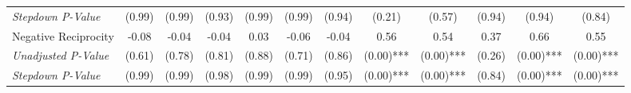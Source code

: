 \begin{tabular}{l c c c c c c c c c c c}
\quad \textit{Stepdown P-Value} & (0.99) & (0.99) & (0.93) & (0.99) & (0.99) & (0.94) & (0.21) & (0.57) & (0.94) & (0.94) & (0.84) \\
Negative Reciprocity & -0.08 & -0.04 & -0.04 & 0.03 & -0.06 & -0.04 & 0.56 & 0.54 & 0.37 & 0.66 & 0.55 \\
\quad \textit{Unadjusted P-Value} & (0.61) & (0.78) & (0.81) & (0.88) & (0.71) & (0.86) & (0.00)*** & (0.00)*** & (0.26) & (0.00)*** & (0.00)*** \\
\quad \textit{Stepdown P-Value} & (0.99) & (0.99) & (0.98) & (0.99) & (0.99) & (0.95) & (0.00)*** & (0.00)*** & (0.84) & (0.00)*** & (0.00)*** \\
\bottomrule
\end{tabular}
